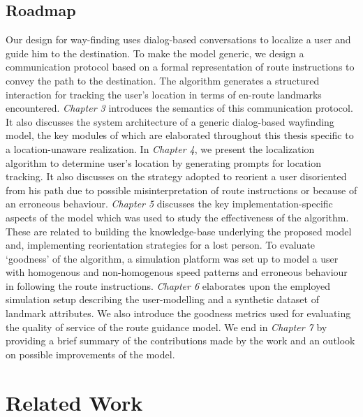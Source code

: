 \documentclass{iitkthesis}
\begin{document}
  \section{Roadmap}
Our design for way-finding uses dialog-based conversations to localize a 
user and guide him to the destination. To make the model generic, we design 
a communication protocol based on a formal representation of route instructions
to convey the path to the destination. The algorithm generates
a structured interaction for tracking the user's 
location in terms of en-route landmarks encountered. 
\textit{Chapter 3} introduces the semantics of this communication protocol. It also discusses the system architecture of a generic dialog-based wayfinding model, the key modules of which are elaborated throughout this thesis specific to a location-unaware realization.
In \textit{Chapter 4}, we present the localization algorithm to determine user's location by generating prompts for location tracking. It also discusses on the strategy adopted to reorient a user disoriented from his path due to possible misinterpretation of route instructions or because of an erroneous behaviour. 
\textit{Chapter 5} discusses the key implementation-specific aspects of the model which was used to study the effectiveness of the algorithm. These are related to building the knowledge-base underlying the proposed model and, implementing reorientation strategies for a lost person. 
To evaluate `goodness' of the algorithm, a simulation platform was set up to model a user with homogenous and non-homogenous speed patterns and erroneous behaviour in following the route instructions. \textit{Chapter 6} elaborates upon the employed simulation setup describing the user-modelling and a synthetic dataset of landmark attributes. We also introduce the goodness metrics used for evaluating the quality of service of the route guidance model. We end in \textit{Chapter 7} by providing a brief summary of the contributions made by the work and an outlook on possible improvements of the model. 

 \chapter{Related Work}
\end{document}
